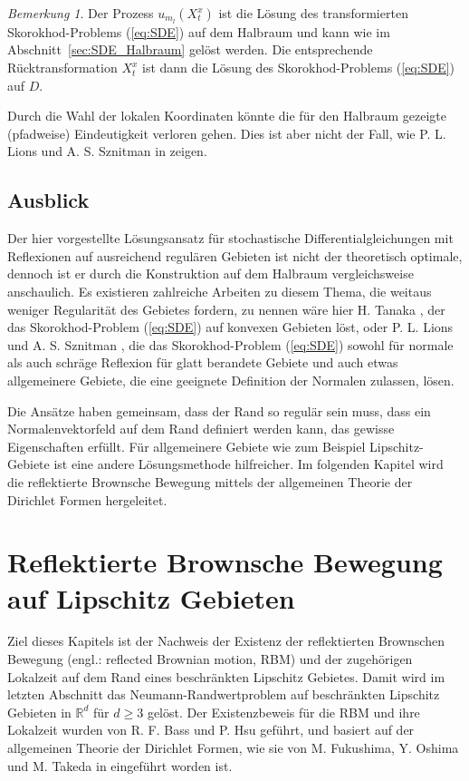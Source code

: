 \documentclass[10pt, a4paper, leqno, twoside, bibliography=totocnumbered, final]{scrartcl}
\theoremstyle{definition}
\theoremstyle{plain}%
\theoremstyle{remark}
\newtheorem*{bem}{Bemerkung}
\begin{document}
\begin{bem}
Der Prozess $ u_{m_l}(X_t^x) $ ist die  Lösung des transformierten Skorokhod-Problems (\ref{eq:SDE}) auf dem Halbraum und kann wie im Abschnitt~\ref{sec:SDE_Halbraum} gelöst werden. Die entsprechende Rücktransformation $ X_t^{x} $ ist dann die Lösung des Skorokhod-Problems (\ref{eq:SDE}) auf $D$. 
\end{bem}

Durch die Wahl der lokalen Koordinaten könnte die für den Halbraum gezeigte (pfadweise) Eindeutigkeit verloren gehen. Dies ist aber nicht der Fall, wie  P. L. Lions und A. S. Sznitman in \cite{Lions-Sznitman} zeigen.

\subsection{Ausblick}

Der hier vorgestellte Lösungsansatz für stochastische Differentialgleichungen mit Reflexionen auf ausreichend regulären Gebieten ist nicht der theoretisch optimale, dennoch ist er durch die Konstruktion auf dem Halbraum vergleichsweise anschaulich. Es existieren zahlreiche Arbeiten zu diesem Thema, die weitaus weniger Regularität des Gebietes fordern, zu nennen wäre hier H. Tanaka \cite{Tanaka}, der das Skorokhod-Problem (\ref{eq:SDE}) auf konvexen Gebieten löst, oder P. L. Lions und A. S. Sznitman \cite{Lions-Sznitman}, die das Skorokhod-Problem (\ref{eq:SDE}) sowohl für normale als auch schräge Reflexion für glatt berandete Gebiete und auch etwas allgemeinere Gebiete, die eine geeignete Definition der Normalen zulassen, lösen.

Die Ansätze haben gemeinsam, dass der Rand so regulär sein muss, dass ein Normalenvektorfeld auf dem Rand definiert werden kann, das gewisse Eigenschaften erfüllt. Für allgemeinere Gebiete wie zum Beispiel Lipschitz-Gebiete ist eine andere Lösungsmethode hilfreicher. Im folgenden Kapitel wird die reflektierte Brownsche Bewegung mittels der allgemeinen Theorie der Dirichlet Formen hergeleitet.


\newpage


\section{Reflektierte Brownsche Bewegung auf Lipschitz Gebieten}
\label{sec:Reflektierte-Brownsche-bewegung-auf-Lipschitz-Gebieten}


Ziel dieses Kapitels ist der Nachweis der Existenz der reflektierten Brownschen Bewegung (engl.: reflected Brownian motion, RBM) und der zugehörigen Lokalzeit auf dem Rand eines beschränkten Lipschitz Gebietes. Damit wird im letzten Abschnitt das Neumann-Randwertproblem auf beschränkten Lipschitz Gebieten in $ \mathbb{R}^d $ für $ d \geq 3 $ gelöst. Der Existenzbeweis für die RBM und ihre Lokalzeit wurden von R. F. Bass und P. Hsu \cite{Lions-Sznitman} geführt, und basiert auf der allgemeinen Theorie der Dirichlet Formen, wie sie von M. Fukushima, Y. Oshima und M. Takeda in \cite{Fukushima} eingeführt worden ist.\\
\end{document}
